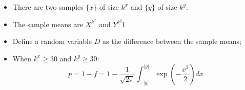   \begin{itemize}
    \item There are two samples $ \{ x \} $ of size $ k^{x} $ and $ \{ y \} $ of size $ k^{y} $.
    \item The sample means are $ X^{k^{x}} $ and $ Y^{k^{y}} $l
    \item Define a random variable $ D $ as the difference between the sample means;
    \item When $ k^{x} \ge 30 $ and $ k^{y} \ge 30 $:
    \begin{equation}
      p = 1 - f = 1 - \frac{1}{\sqrt{2\pi}} \int_{-\left| g \right|}^{\left| g \right|} \exp\left( -\frac{x^{2}}{2} \right) dx
    \end{equation}
  \end{itemize}